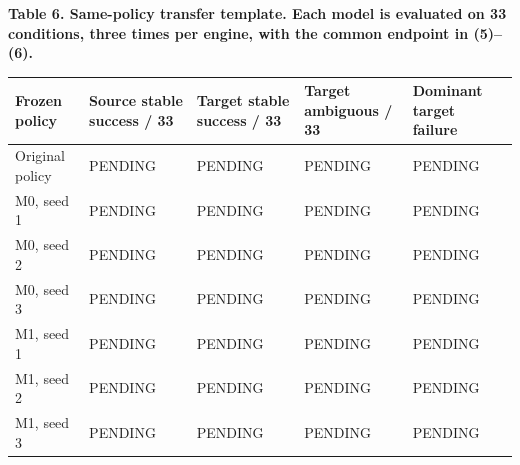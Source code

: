 \documentclass[
  american,
  11pt,
  a4paper,
]{article}
\newcounter{none} %
\begin{document}
\par\medskip
\noindent\begin{minipage}{\linewidth}
\textbf{Table 6. Same-policy transfer template. Each model is evaluated
on 33 conditions, three times per engine, with the common endpoint in
(5)--(6).}

{\def\LTcaptype{none} %
\begin{tabular}{@{}
  >{\raggedright\arraybackslash}p{}
  >{\centering\arraybackslash}p{}
  >{\centering\arraybackslash}p{}
  >{\centering\arraybackslash}p{}
  >{\raggedright\arraybackslash}p{}@{}}
\toprule\noalign{}
\begin{minipage}[b]{\linewidth}\raggedright
Frozen policy
\end{minipage} & \begin{minipage}[b]{\linewidth}\centering
Source stable success / 33
\end{minipage} & \begin{minipage}[b]{\linewidth}\centering
Target stable success / 33
\end{minipage} & \begin{minipage}[b]{\linewidth}\centering
Target ambiguous / 33
\end{minipage} & \begin{minipage}[b]{\linewidth}\raggedright
Dominant target failure
\end{minipage} \\
\midrule\noalign{}
Original policy & PENDING & PENDING & PENDING & PENDING \\
M0, seed 1 & PENDING & PENDING & PENDING & PENDING \\
M0, seed 2 & PENDING & PENDING & PENDING & PENDING \\
M0, seed 3 & PENDING & PENDING & PENDING & PENDING \\
M1, seed 1 & PENDING & PENDING & PENDING & PENDING \\
M1, seed 2 & PENDING & PENDING & PENDING & PENDING \\
M1, seed 3 & PENDING & PENDING & PENDING & PENDING \\
\bottomrule
\end{tabular}
}
\end{minipage}
\par\medskip
\end{document}
